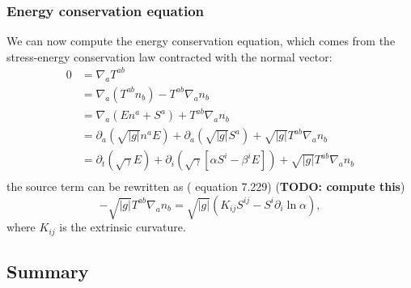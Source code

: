 \documentclass[12pt]{article}
\numberwithin{equation}{section}
\begin{document}
\subsubsection{Energy conservation equation}

We can now compute the energy conservation equation, which comes from the stress-energy conservation law contracted with the normal vector:
\begin{equation}
\begin{aligned}
0 &= \nabla_a T^{ab} \\
&= \nabla_a (T^{ab} n_b) - T^{ab} \nabla_a n_b \\
&= \nabla_a (E n^a + S^a) + T^{ab} \nabla_a n_b \\
&= \partial_a (\sqrt{|g|} n^a E) + \partial_a (\sqrt{|g|} S^a) + \sqrt{|g|} T^{ab} \nabla_a n_b \\
&= \partial_t (\sqrt{\gamma} E) + \partial_i (\sqrt{\gamma} [\alpha S^i - \beta^i E]) + \sqrt{|g|} T^{ab} \nabla_a n_b \\
\end{aligned}
\end{equation}
the source term can be rewritten as (\cite{RezzollaZanotti} equation 7.229) (\textbf{TODO: compute this})
\begin{equation}
-\sqrt{|g|} T^{ab} \nabla_{a} n_b = \sqrt{|g|} (K_{ij} S^{ij} - S^{i} \partial_{i} \ln \alpha),
\end{equation}
where $K_{ij}$ is the extrinsic curvature.

\subsection{Summary}
\end{document}
